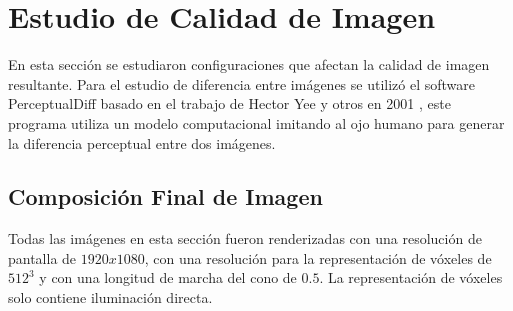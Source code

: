 \section{Estudio de Calidad de Imagen}

En esta sección se estudiaron configuraciones que afectan la calidad de imagen resultante. Para el estudio de diferencia entre imágenes se utilizó el software PerceptualDiff basado en el trabajo de Hector Yee y otros en 2001 \cite{Yee:2001:SSV:383745.383748}, este programa utiliza un modelo computacional imitando al ojo humano para generar la diferencia perceptual entre dos imágenes.

\subsection{Composición Final de Imagen}
\label{subsec:final}
Todas las imágenes en esta sección fueron renderizadas con una resolución de pantalla de $1920x1080$, con una resolución para la representación de vóxeles de $512^3$ y con una longitud de marcha del cono de $0.5$. La representación de vóxeles solo contiene iluminación directa.

